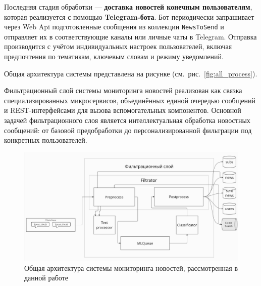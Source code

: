 Последняя стадия обработки — \textbf{доставка новостей конечным пользователям}, которая реализуется с помощью \textbf{Telegram-бота}.
Бот периодически запрашивает через Web Api подготовленные сообщения из коллекции \texttt{NewsToSend} и отправляет их в соответствующие каналы или личные чаты в Telegram.
Отправка производится с учётом индивидуальных настроек пользователей, включая предпочтения по тематикам, ключевым словам и режиму уведомлений.

Общая архитектура системы представлена на рисунке (см.\ рис.~\ref{fig:all_process}).

\label{subsec:filtersloy}
Фильтрационный слой системы мониторинга новостей реализован как связка специализированных микросервисов, объединённых единой очередью сообщений и REST-интерфейсами для вызова вспомогательных компонентов.
Основной задачей фильтрационного слоя является интеллектуальная обработка новостных сообщений: от базовой предобработки до персонализированной фильтрации под конкретных пользователей.

\begin{figure}[H]
    \centering
    \includegraphics[width=150mm]{images/filter_process}
    \caption{Общая архитектура системы мониторинга новостей, рассмотренная в данной работе}
    \label{fig:filter_process}
\end{figure}

